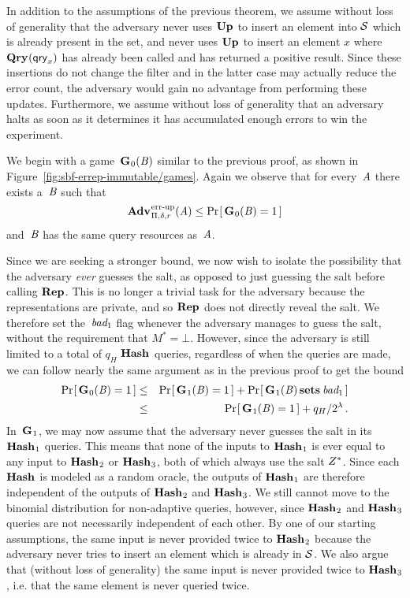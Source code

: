 In addition to the assumptions of the previous theorem, we assume without loss of generality that the adversary never uses $\textup{\textbf{Up}}\hspace{0.5pt}$ to insert an element into $\mathcal{S}$ which is already present in the set, and never uses $\textup{\textbf{Up}}\hspace{0.5pt}$ to insert an element $x$ where $\textup{\textbf{Qry}}\hspace{0.5pt}(\mathsf{qry}_x)$ has already been called and has returned a positive result. Since these insertions do not change the filter and in the latter case may actually reduce the error count, the adversary would gain no advantage from performing these updates. Furthermore, we assume without loss of generality that an adversary halts as soon as it determines it has accumulated enough errors to win the experiment.

We begin with a game~$\textup{\textbf{G}}\hspace{0.5pt}_0(\mathit{B})$ similar to the previous proof, as shown in Figure~\ref{fig:sbf-errep-immutable/games}. Again we observe that for every~$\mathit{A}$ there exists a~$\mathit{B}$  such that
\begin{equation}
  \Adv{\errep}_{\Pi,\delta,r}(\advA) \leq \Prob{\game_0(\advB) = 1}
\end{equation}
and~$\mathit{B}$ has the same query resources as~$\mathit{A}$.

Since we are seeking a stronger bound, we now wish to isolate the possibility that the adversary \emph{ever} guesses the salt, as opposed to just guessing the salt before calling $\textup{\textbf{Rep}}\hspace{0.5pt}$. This is no longer a trivial task for the adversary because the representations are private, and so $\textup{\textbf{Rep}}\hspace{0.5pt}$ does not directly reveal the salt. We therefore set the~$\textit{bad}_1$ flag whenever the adversary manages to guess the salt, without the requirement that $M^* = \bot$. However, since the adversary is still limited to a total of $q_H$ $\textup{\textbf{Hash}}\hspace{0.5pt}$ queries, regardless of when the queries are made, we can follow nearly the same argument as in the previous proof to get the bound
%
\begin{eqnarray}
  \Pr\hspace{-1pt}\left[\,\textup{\textbf{G}}\hspace{0.5pt}_0(\mathit{B})=1\,\right] &\leq&
    \Pr\hspace{-1pt}\left[\,\textup{\textbf{G}}\hspace{0.5pt}_1(\mathit{B})=1\,\right] + \Pr\hspace{-1pt}\left[\,\textup{\textbf{G}}\hspace{0.5pt}_1(\mathit{B}) \,\textup{\textbf{sets}}\hspace{0.5pt}\, \textit{bad}_1\,\right]\\
  &\leq&
    \Pr\hspace{-1pt}\left[\,\textup{\textbf{G}}\hspace{0.5pt}_1(\mathit{B})=1\,\right] + q_H/2^\lambda \,.
\end{eqnarray}
%
In~$\textup{\textbf{G}}\hspace{0.5pt}_1$, we may now assume that the adversary never guesses the salt in its $\textup{\textbf{Hash}}\hspace{0.5pt}_1$ queries. This means that none of the inputs to $\textup{\textbf{Hash}}\hspace{0.5pt}_1$ is ever equal to any input to $\textup{\textbf{Hash}}\hspace{0.5pt}_2$ or $\textup{\textbf{Hash}}\hspace{0.5pt}_3$, both of which always use the salt $Z^*$. Since each $\textup{\textbf{Hash}}\hspace{0.5pt}$ is modeled as a random oracle, the outputs of $\textup{\textbf{Hash}}\hspace{0.5pt}_1$ are therefore independent of the outputs of $\textup{\textbf{Hash}}\hspace{0.5pt}_2$ and $\textup{\textbf{Hash}}\hspace{0.5pt}_3$.
%
We still cannot move to the binomial distribution for non-adaptive queries, however, since $\textup{\textbf{Hash}}\hspace{0.5pt}_2$ and $\textup{\textbf{Hash}}\hspace{0.5pt}_3$ queries are not necessarily independent of each other. By one of our starting assumptions, the same input is never provided twice to $\textup{\textbf{Hash}}\hspace{0.5pt}_2$ because the adversary never tries to insert an element which is already in $\mathcal{S}$. We also argue that (without loss of generality) the same input is never provided twice to $\textup{\textbf{Hash}}\hspace{0.5pt}_3$, i.e. that the same element is never queried twice.

